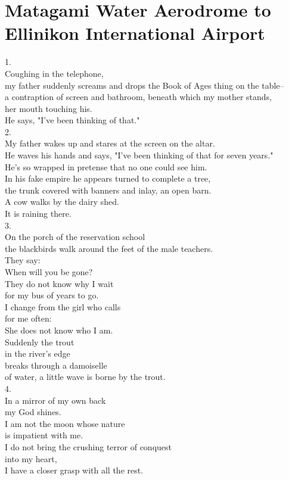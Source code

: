 \documentclass[smalldemyvopaper,11pt,twoside,onecolumn,openright,extrafontsizes]{memoir}
\newlength\drop
\begin{document}
\chapter{Matagami Water Aerodrome to Ellinikon International Airport}
1.
\\Coughing in the telephone,
\\my father suddenly screams and drops the Book of Ages thing on the table--
\\a contraption of screen and bathroom, beneath which my mother stands,
\\her mouth touching his.
\\He says, "I've been thinking of that."
\\2.
\\My father wakes up and stares at the screen on the altar.
\\He waves his hands and says, "I've been thinking of that for seven years."
\\He's so wrapped in pretense that no one could see him.
\\In his fake empire he appears turned to complete a tree,
\\the trunk covered with banners and inlay, an open barn.
\\A cow walks by the dairy shed.
\\It is raining there.
\\3.
\\On the porch of the reservation school
\\the blackbirds walk around the feet of the male teachers.
\\They say:
\\When will you be gone?
\\They do not know why I wait
\\for my bus of years to go.
\\I change from the girl who calls
\\for me often:
\\She does not know who I am.
\\Suddenly the trout
\\in the river's edge
\\breaks through a damoiselle
\\of water, a little wave is borne by the trout.
\\4.
\\In a mirror of my own back
\\my God shines.
\\I am not the moon whose nature
\\is impatient with me.
\\I do not bring the crushing terror of conquest
\\into my heart,
\\I have a closer grasp with all the rest.
\end{document}
